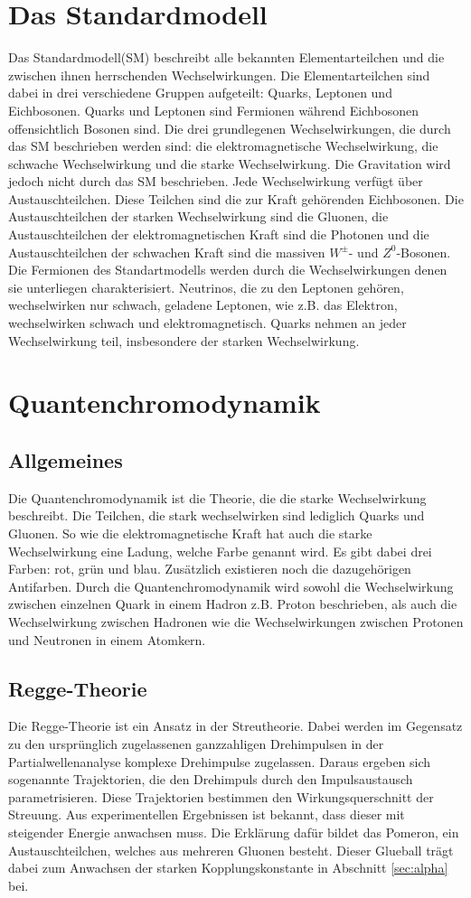 \section{Das Standardmodell}
Das Standardmodell(SM) beschreibt alle bekannten Elementarteilchen und die zwischen ihnen herrschenden Wechselwirkungen. Die Elementarteilchen sind dabei in drei verschiedene Gruppen aufgeteilt: Quarks, Leptonen und Eichbosonen. Quarks und Leptonen sind Fermionen während Eichbosonen offensichtlich Bosonen sind. Die drei grundlegenen Wechselwirkungen, die durch das SM beschrieben werden sind: die elektromagnetische Wechselwirkung, die schwache Wechselwirkung und die starke Wechselwirkung. Die Gravitation wird jedoch nicht durch das SM beschrieben.
Jede Wechselwirkung verfügt über Austauschteilchen. Diese Teilchen sind die zur Kraft gehörenden Eichbosonen. Die Austauschteilchen der starken Wechselwirkung sind die Gluonen, die Austauschteilchen der elektromagnetischen Kraft sind die Photonen und die Austauschteilchen der schwachen Kraft sind die massiven $W^{\pm}$- und $Z^{0}$-Bosonen.
Die Fermionen des Standartmodells werden durch die Wechselwirkungen denen sie unterliegen charakterisiert. Neutrinos, die zu den Leptonen gehören, wechselwirken nur schwach, geladene Leptonen, wie z.B. das Elektron, wechselwirken schwach und elektromagnetisch. Quarks nehmen an jeder Wechselwirkung teil, insbesondere der starken Wechselwirkung.

\section{Quantenchromodynamik}
\subsection{Allgemeines}
Die Quantenchromodynamik ist die Theorie, die die starke Wechselwirkung beschreibt. Die Teilchen, die stark wechselwirken sind lediglich Quarks und Gluonen. So wie die elektromagnetische Kraft hat auch die starke Wechselwirkung eine Ladung, welche Farbe genannt wird. Es gibt dabei drei Farben: rot, grün und blau. Zusätzlich existieren noch die dazugehörigen Antifarben. Durch die Quantenchromodynamik wird sowohl die Wechselwirkung zwischen einzelnen Quark in einem Hadron z.B. Proton beschrieben, als auch die Wechselwirkung zwischen Hadronen wie die Wechselwirkungen zwischen Protonen und Neutronen in einem Atomkern.
\subsection{Regge-Theorie}
Die Regge-Theorie ist ein Ansatz in der Streutheorie. Dabei werden im Gegensatz zu den ursprünglich zugelassenen ganzzahligen Drehimpulsen in der Partialwellenanalyse komplexe Drehimpulse zugelassen. Daraus ergeben sich sogenannte Trajektorien, die den Drehimpuls durch den Impulsaustausch parametrisieren. Diese Trajektorien bestimmen den Wirkungsquerschnitt der Streuung. Aus experimentellen Ergebnissen ist bekannt, dass dieser mit steigender Energie anwachsen muss. Die Erklärung dafür bildet das Pomeron, ein Austauschteilchen, welches aus mehreren Gluonen besteht. Dieser Glueball trägt dabei zum Anwachsen der starken Kopplungskonstante in Abschnitt \ref{sec:alpha} bei.

